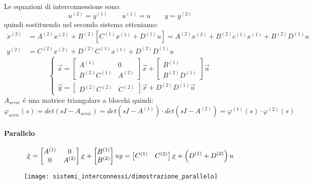 \documentclass[../main.tex]{subfiles}
\begin{document}
			Le equazioni di interconnessione sono:
			\[
				u^{(2)} = y^{(1)} \qquad u^{(1)} = u \qquad y = y^{(2)}
			\]
			quindi sostituendo nel secondo sistema otteniamo:
			\[
				\begin{aligned}
					\dot x^{(2)} &= A^{(2)} x^{(2)} + B^{(2)} \left[ C^{(1)} x^{(1)} + D^{(1)} u \right] = A^{(2)} x^{(2)} + B^{(2)} c^{(1)} x^{(1)} + B^{(2)} D^{(1)} u
					\\
					y^{(2)} &= C^{(2)} x^{(2)} + D^{(2)} C^{(1)} x^{(1)} + D^{(2)} D^{(1)} u
				\end{aligned}
			\]
			\[
				\begin{cases}
						\dot{\vec x} =
						\begin{bmatrix}
							A^{(1)} & 0\\
							B^{(2)} C^{(1)} & A^{(2)}
						\end{bmatrix} \vec x +
						\begin{bmatrix}
							B^{(1)}\\
							B^{(2)} D^{(1)}
						\end{bmatrix} \vec u
						\\
						\vec y =
						\begin{bmatrix}
							D^{(2)} C^{(2)} & C^{(2)}
						\end{bmatrix} \vec x + 
						D^{(2)} D^{(1)} \vec u
				\end{cases}
			\]
			$ A_{serie} $ \'e una matrice triangolare a blocchi quindi:
			\[
				\varphi_{serie}(s) = det(sI-A_{serie}) = det(sI-A^{(1)}) \cdot det(sI-A^{(2)}) = \varphi^{(1)}(s) \cdot \varphi^{(2)}(s)
			\]
		\paragraph{Parallelo}
			\[
				\dot{\vec x} = 
				\begin{bmatrix}
					A^{(1)} & 0\\
					0 & A^{(2)}
				\end{bmatrix} \vec x +
				\begin{bmatrix}
					B^{(1)}\\
					B^{(2)}
				\end{bmatrix} u
				\\
				y = 
				\begin{bmatrix}
					C^{(1)} & C^{(2)}
				\end{bmatrix} \vec x +
				\left( D^{(1)} + D^{(2)} \right) u
			\]
			\begin{figure}[h!]
				\centering\texttt{[image: sistemi\_interconnessi/dimostrazione\_parallelo]}
			\end{figure}
		
\end{document}
